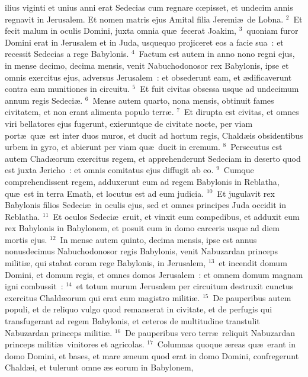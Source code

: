 \bchapter
{}ilius viginti et unius anni erat Sedecias cum regnare cœpisset, et undecim annis regnavit in Jerusalem. Et nomen matris ejus Amital filia Jeremi\ae\ de Lobna.
${}^{2}$~Et fecit malum in oculis Domini, juxta omnia qu\ae\ fecerat Joakim,
${}^{3}$~quoniam furor Domini erat in Jerusalem et in Juda, usquequo projiceret eos a facie sua~: et recessit Sedecias a rege Babylonis.
${}^{4}$~Factum est autem in anno nono regni ejus, in mense decimo, decima mensis, venit Nabuchodonosor rex Babylonis, ipse et omnis exercitus ejus, adversus Jerusalem~: et obsederunt eam, et \ae dificaverunt contra eam munitiones in circuitu.
${}^{5}$~Et fuit civitas obsessa usque ad undecimum annum regis Sedeci\ae .
${}^{6}$~Mense autem quarto, nona mensis, obtinuit fames civitatem, et non erant alimenta populo terr\ae .
${}^{7}$~Et dirupta est civitas, et omnes viri bellatores ejus fugerunt, exieruntque de civitate nocte, per viam port\ae\ qu\ae\ est inter duos muros, et ducit ad hortum regis, Chald\ae is obsidentibus urbem in gyro, et abierunt per viam qu\ae\ ducit in eremum.
${}^{8}$~Persecutus est autem Chad\ae orum exercitus regem, et apprehenderunt Sedeciam in deserto quod est juxta Jericho~: et omnis comitatus ejus diffugit ab eo.
${}^{9}$~Cumque comprehendissent regem, adduxerunt eum ad regem Babylonis in Reblatha, qu\ae\ est in terra Emath, et locutus est ad eum judicia.
${}^{10}$~Et jugulavit rex Babylonis filios Sedeci\ae\ in oculis ejus, sed et omnes principes Juda occidit in Reblatha.
${}^{11}$~Et oculos Sedeci\ae\ eruit, et vinxit eum compedibus, et adduxit eum rex Babylonis in Babylonem, et posuit eum in domo carceris usque ad diem mortis ejus.
${}^{12}$~In mense autem quinto, decima mensis, ipse est annus nonusdecimus Nabuchodonosor regis Babylonis, venit Nabuzardan princeps militi\ae , qui stabat coram rege Babylonis, in Jerusalem,
${}^{13}$~et incendit domum Domini, et domum regis, et omnes domos Jerusalem~: et omnem domum magnam igni combussit~:
${}^{14}$~et totum murum Jerusalem per circuitum destruxit cunctus exercitus Chald\ae orum qui erat cum magistro militi\ae .
${}^{15}$~De pauperibus autem populi, et de reliquo vulgo quod remanserat in civitate, et de perfugis qui transfugerant ad regem Babylonis, et ceteros de multitudine transtulit Nabuzardan princeps militi\ae .
${}^{16}$~De pauperibus vero terr\ae\ reliquit Nabuzardan princeps militi\ae\ vinitores et agricolas.
${}^{17}$~Columnas quoque \ae reas qu\ae\ erant in domo Domini, et bases, et mare \ae neum quod erat in domo Domini, confregerunt Chald\ae i, et tulerunt omne \ae s eorum in Babylonem,
